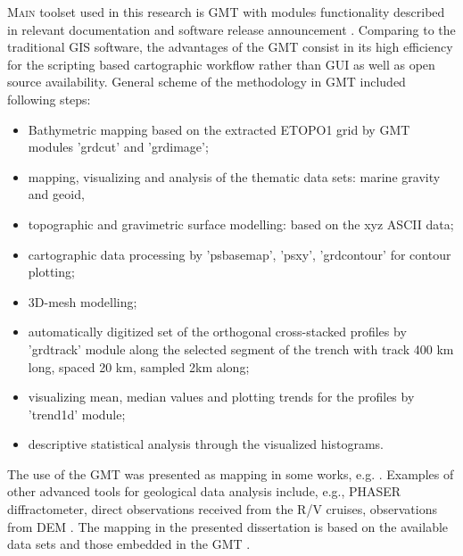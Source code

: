 \documentclass[11pt,a4paper]{report}
\begin{document}
{\lettrine[lines=3]{\color{Magenta4}M}{ain} toolset used in this research is \ac{GMT} with modules functionality described in relevant documentation and software release announcement \cite{Wesseletal2013}. Comparing to the traditional \ac{GIS} software, the advantages of the \ac{GMT} consist in its high efficiency for the scripting based cartographic workflow rather than \ac{GUI} as well as open source availability. General scheme of the methodology in \ac{GMT} included following steps: 

\begin{itemize}
	\item Bathymetric mapping based on the extracted \ac{ETOPO1} grid by \ac{GMT} modules 'grdcut' and 'grdimage'; 
	\item mapping, visualizing and analysis of the thematic data sets: marine gravity and geoid,
	\item topographic and gravimetric surface modelling: based on the xyz \ac{ASCII} data; 
	\item cartographic data processing by 'psbasemap', 'psxy', 'grdcontour' for contour plotting; 
	\item 3D-mesh modelling; 
	\item automatically digitized set of the orthogonal cross-stacked profiles by 'grdtrack' module along the selected segment of the trench with track 400 km long, spaced 20 km, sampled 2km along;
	\item visualizing mean, median values and plotting trends for the profiles by 'trend1d' module; 
	\item descriptive statistical analysis through the visualized histograms. 
\end{itemize}

The use of the \ac{GMT} was presented as mapping in some works, e.g. \cite{Hsuetal2012}. Examples of other advanced tools for geological data analysis include, e.g., PHASER diffractometer, direct observations received from the \ac{R/V} cruises, observations from \ac{DEM} \cite{Giletycz}. The mapping in the presented dissertation is based on the available data sets and those embedded in the \ac{GMT} \cite{SmithSandwell1997a}. 

}
\end{document}
